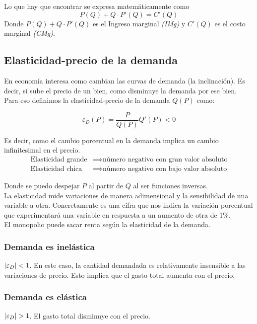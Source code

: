 Lo que hay que encontrar se expresa matemáticamente como
\[ P(Q) + Q\cdot P'(Q) = C'(Q) \]
Donde $P(Q) + Q\cdot P'(Q)$ es el Ingreso marginal \textit{(IMg)} y $C'(Q)$ es el costo marginal \textit{(CMg)}.

\subsection{Elasticidad-precio de la demanda}
En economía interesa como cambian las curvas de demanda (la inclinación). Es decir, si sube el precio de un bien, como disminuye la demanda por ese bien.\\

Para eso definimos la elasticidad-precio de la demanda $Q(P)$ como:

\[\varepsilon_D(P) = \frac{P}{Q(P)}Q'(P) < 0\]

Es decir, como el cambio porcentual en la demanda implica un cambio infinitesimal en el precio.
\begin{equation}
    \begin{split}
        \text{Elasticidad grande} &\implies \text{número negativo con gran valor absoluto}\\
        \text{Elasticidad chica} &\implies \text{número negativo con bajo valor absoluto}
    \end{split}
    \nonumber
\end{equation}

Donde se puedo despejar $P$ al partir de $Q$ al ser funciones inversas.\\

La elasticidad mide variaciones de manera adimensional y la sensibilidad de una variable a otra. Concretamente es una cifra que nos indica la variación porcentual que experimentará una variable en respuesta a un aumento de otra de 1\%.\\

El monopolio puede sacar renta según la elasticidad de la demanda.

\subsubsection{Demanda es inelástica}
$\abs{\varepsilon_D} < 1$. En este caso, la cantidad demandada es relativamente insensible a las variaciones de precio. Esto implica que el gasto total aumenta con el precio.

\subsubsection{Demanda es elástica}
$\abs{\varepsilon_D} > 1$. El gasto total disminuye con el precio.

